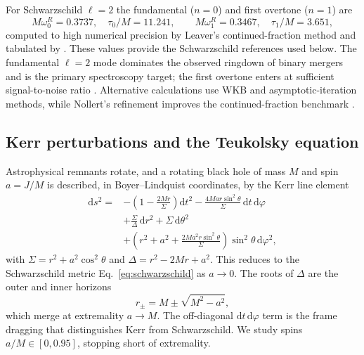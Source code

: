 \documentclass[11pt,a4paper]{article}
\theoremstyle{definition}
\begin{document}
For Schwarzschild $\ell = 2$ the fundamental ($n = 0$) and
first overtone ($n = 1$) are
\begin{equation}
  M\omega_{0}^{R} = 0.3737, \quad \tau_{0}/M = 11.241,
  \qquad
  M\omega_{1}^{R} = 0.3467, \quad \tau_{1}/M = 3.651,
  \label{eq:qnm-ref}
\end{equation}
computed to high numerical precision by Leaver's
continued-fraction method \citep{Leaver1985} and tabulated by
\citet{Berti2009review}. These values provide the Schwarzschild
references used below. The fundamental $\ell = 2$
mode dominates the observed ringdown of binary mergers and is
the primary spectroscopy target; the first overtone enters at
sufficient signal-to-noise ratio
\citep{Buonanno2007ringdown,LIGO2016ringdown,Isi2021priors}.
Alternative calculations use WKB and asymptotic-iteration
methods, while Nollert's refinement improves the
continued-fraction benchmark
\citep{SchutzWill1985,IyerWill1987,Konoplya2003wkb,
Cho2010aim,Nollert1993}.

\subsection{Kerr perturbations and the Teukolsky equation}
\label{sec:teukolsky-problem}

Astrophysical remnants rotate, and a rotating black hole of mass $M$ and spin
$a = J/M$ is described, in Boyer--Lindquist coordinates, by the
Kerr line element
\begin{equation}
  \begin{aligned}
  \mathrm{d}s^{2} ={}&
    -\left(1 - \frac{2Mr}{\Sigma}\right)\mathrm{d}t^{2}
    - \frac{4 M a r \sin^{2}\!\theta}{\Sigma}\,
       \mathrm{d}t\,\mathrm{d}\varphi \\
    &+ \frac{\Sigma}{\Delta}\,\mathrm{d}r^{2}
    + \Sigma\,\mathrm{d}\theta^{2} \\
    &+ \left(r^{2} + a^{2}
       + \frac{2 M a^{2} r \sin^{2}\!\theta}{\Sigma}\right)
       \sin^{2}\!\theta\,\mathrm{d}\varphi^{2},
  \end{aligned}
  \label{eq:kerr-metric}
\end{equation}
with $\Sigma = r^{2} + a^{2}\cos^{2}\theta$ and
$\Delta = r^{2} - 2Mr + a^{2}$. This reduces to the
Schwarzschild metric Eq.~\eqref{eq:schwarzschild} as
$a \to 0$. The roots of $\Delta$ are the outer and inner
horizons
\begin{equation}
  r_{\pm} = M \pm \sqrt{M^{2} - a^{2}},
  \label{eq:kerr-horizons}
\end{equation}
which merge at extremality $a \to M$. The off-diagonal
$\mathrm{d}t\,\mathrm{d}\varphi$ term is the frame dragging that
distinguishes Kerr from Schwarzschild. We study spins
$a/M \in [0, 0.95]$, stopping short of extremality.
\end{document}
